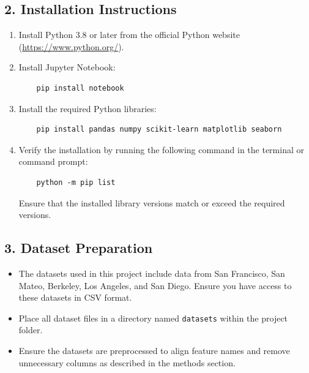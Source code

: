 \documentclass[10pt,twocolumn]{article}
\begin{document}
\begin{itemize}
\subsection*{2. Installation Instructions}
\begin{enumerate}
    \item Install Python 3.8 or later from the official Python website (\url{https://www.python.org/}).
    \item Install Jupyter Notebook:
    \begin{verbatim}
    pip install notebook
    \end{verbatim}
    \item Install the required Python libraries:
    \begin{verbatim}
    pip install pandas numpy scikit-learn matplotlib seaborn
    \end{verbatim}
    \item Verify the installation by running the following command in the terminal or command prompt:
    \begin{verbatim}
    python -m pip list
    \end{verbatim}
    Ensure that the installed library versions match or exceed the required versions.
\end{enumerate}

\subsection*{3. Dataset Preparation}
\begin{itemize}
    \item The datasets used in this project include data from San Francisco, San Mateo, Berkeley, Los Angeles, and San Diego. Ensure you have access to these datasets in CSV format.
    \item Place all dataset files in a directory named \texttt{datasets} within the project folder.
    \item Ensure the datasets are preprocessed to align feature names and remove unnecessary columns as described in the methods section.
\end{itemize}


\end{itemize}
\end{document}
